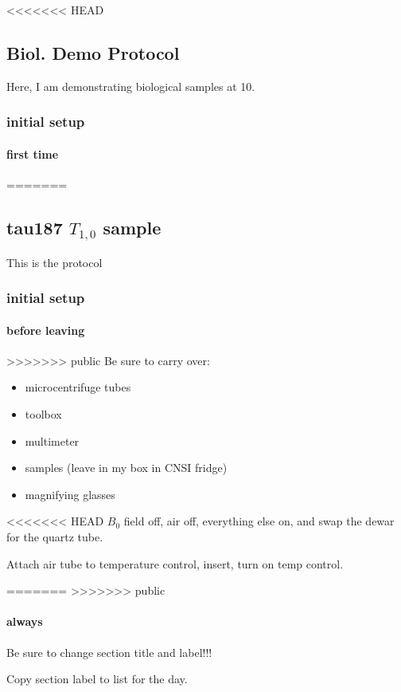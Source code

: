 <<<<<<< HEAD
\subsection{Biol. Demo Protocol}\label{sec:biol_}
\timeblockstart
{}
Here, I am demonstrating biological samples at 10\uM.

\subsubsection{initial setup}
\paragraph{first time}
=======
\subsection{tau187 $T_{1,0}$ sample}\label{sec:biol_tau_unlabeled}
\timeblockstart
{}
This is the protocol

\subsubsection{initial setup}
\paragraph{before leaving}
>>>>>>> public
Be sure to carry over:
\begin{itemize}
    \item microcentrifuge tubes
    \item toolbox 
    \item multimeter 
    \item samples (leave in my box in CNSI fridge)
    \item magnifying glasses
\end{itemize}

<<<<<<< HEAD
$B_0$ field off, air off, everything else on, and swap the dewar for the quartz tube.

Attach air tube to temperature control, insert, turn on temp control.

=======
>>>>>>> public
\paragraph{always}
Be sure to change section title and label!!!

Copy section label to list for the day.

